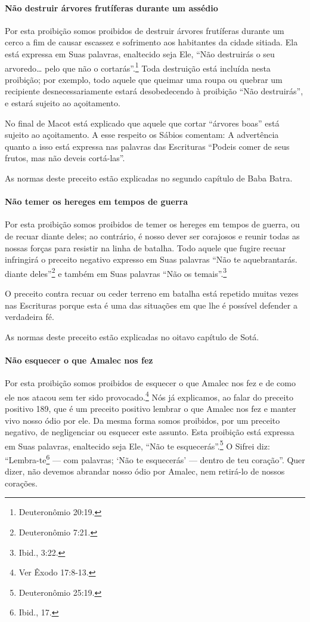 \paragraph{Não destruir árvores frutíferas durante um assédio}

Por esta proibição somos proibidos de destruir árvores frutíferas
durante um cerco a fim de causar escassez e sofrimento aos habitantes da
cidade sitiada. Ela está expressa em Suas palavras, enaltecido seja Ele,
``Não destruirás o seu arvoredo\ldots{} pelo que não o cortarás''.\footnote{Deuteronômio 20:19.} Toda
destruição está incluída nesta proibição; por exemplo, todo aquele que
queimar uma roupa ou quebrar um recipiente desnecessariamente estará
desobedecendo à proibição ``Não destruirás'', e estará sujeito ao
açoitamento.

No final de Macot está explicado que aquele que cortar ``árvores boas''
está sujeito ao açoitamento. A esse respeito os Sábios comentam: A
advertência quanto a isso está expressa nas palavras das Escrituras
``Podeis comer de seus frutos, mas não deveis cortá-las''.

As normas deste preceito estão explicadas no segundo capítulo de Baba
Batra.

\paragraph{Não temer os hereges em tempos de guerra}

Por esta proibição somos proibidos de temer os hereges em tempos de
guerra, ou de recuar diante deles; ao contrário, é nosso dever ser
corajosos e reunir todas as nossas forças para resistir na linha de
batalha. Todo aquele que fugire recuar infringirá o preceito negativo
expresso em Suas palavras ``Não te aquebrantarás. diante deles''\footnote{Deuteronômio 7:21.} e também em Suas palavras ``Não os temais''.\footnote{Ibid.,
3:22.}

O preceito contra recuar ou ceder terreno em batalha está repetido
muitas vezes nas Escrituras porque esta é uma das situações em que lhe é
possível defender a verdadeira fé.

As normas deste preceito estão explicadas no oitavo capítulo de Sotá.

\paragraph{Não esquecer o que Amalec nos fez}

Por esta proibição somos proibidos de esquecer o que Amalec nos fez e de
como ele nos atacou sem ter sido provocado.\footnote{Ver Êxodo 17:8-13.} Nós já
explicamos, ao falar do preceito positivo 189, que é um preceito
positivo lembrar o que Amalec nos fez e manter vivo nosso ódio por ele.
Da mesma forma somos proibidos, por um preceito negativo, de
negligenciar ou esquecer este assunto. Esta proibição está expressa em
Suas palavras, enaltecido seja Ele, ``Não te esquecerás''.\footnote{Deuteronômio
25:19.} O Sifrei diz: ``Lembra-te\footnote{Ibid., 17.} --- com palavras; `Não te
esquecerás' --- dentro de teu coração''. Quer dizer, não devemos
abrandar nosso ódio por Amalec, nem retirá-lo de nossos corações.

